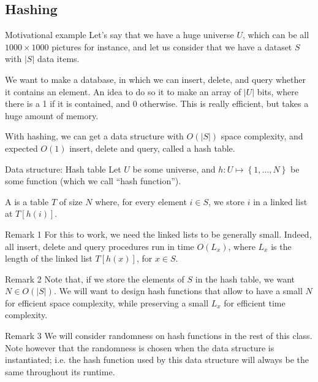 \documentclass[a4paper]{article}
\begin{document}
\subsection{Hashing}

\begin{parag}{Motivational example}
    Let's say that we have a huge universe $U$, which can be all $1000 \times 1000$ pictures for instance, and let us consider that we have a dataset $S$ with $\left|S\right|$ data items. 

    We want to make a database, in which we can insert, delete, and query whether it contains an element. An idea to do so it to make an array of $\left|U\right|$ bits, where there is a 1 if it is contained, and 0 otherwise. This is really efficient, but takes a huge amount of memory. 

    With hashing, we can get a data structure with $O\left(\left|S\right|\right)$ space complexity, and expected $O\left(1\right)$ insert, delete and query, called a hash table.
\end{parag}

\begin{parag}{Data structure: Hash table}
    Let $U$ be some universe, and $h: U \mapsto \left\{1, \ldots, N\right\}$ be some function (which we call ``hash function'').

    A  is a table $T$ of size $N$ where, for every element $i \in S$, we store $i$ in a linked list at $T\left[h\left(i\right)\right]$.

    \begin{subparag}{Remark 1}
         For this to work, we need the linked lists to be generally small. Indeed, all insert, delete and query procedures run in time $O\left(L_x\right)$, where $L_x$ is the length of the linked list $T\left[h\left(x\right)\right]$, for $x \in S$.
    \end{subparag}

    \begin{subparag}{Remark 2}
        Note that, if we store the elements of $S$ in the hash table, we want $N \in O\left(\left|S\right|\right)$. We will want to design hash functions that allow to have a small $N$ for efficient space complexity, while preserving a small $L_x$ for efficient time complexity.
    \end{subparag}

    \begin{subparag}{Remark 3}
        We will consider randomness on hash functions in the rest of this class. Note however that the randomness is chosen when the data structure is instantiated; i.e. the hash function used by this data structure will always be the same throughout its runtime.
    \end{subparag}
\end{parag}
\end{document}
